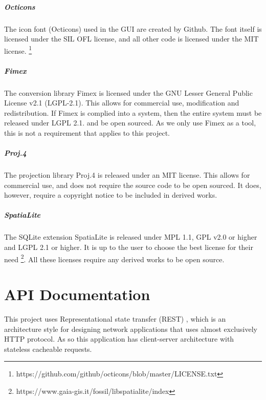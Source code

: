 \documentclass[11pt,a4paper,titlepage,oneside]{report}
\begin{document}
\paragraph{Octicons}
The icon font (Octicons) used in the \gls{GUI} are created by Github. The font itself is licensed under the SIL OFL license, and all other code is licensed under the MIT license. \footnote{https://github.com/github/octicons/blob/master/LICENSE.txt}

\paragraph{Fimex} The conversion library \gls{Fimex} is licensed under the GNU Lesser General Public License v2.1 (LGPL-2.1). This allows for commercial use, modification and redistribution. If \gls{Fimex} is complied into a system, then the entire system must be released under LGPL 2.1. and be open sourced. As we only use \gls{Fimex} as a tool, this is not a requirement that applies to this project.

\paragraph{Proj.4} The projection library Proj.4 is released under an MIT license. This allows for commercial use, and does not require the source code to be open sourced. It does, however, require a copyright notice to be included in derived works.

\paragraph{SpatiaLite} The SQLite extension SpatiaLite is released under MPL 1.1, GPL v2.0 or higher and LGPL 2.1 or higher. It is up to the user to choose the best license for their need \footnote{https://www.gaia-gis.it/fossil/libspatialite/index}. All these licenses require any derived works to be open source.  


\begin{flushleft}
	
\end{flushleft}



\appendix
\printglossary[type=\acronymtype]
\printglossary
\chapter{API Documentation}
This project uses Representational state transfer (REST) \cite{REST:elkstein}, which is an architecture style for designing network applications that uses almost exclusively \gls{HTTP} \gls{protocol}. As so this application has client-server architecture with stateless cacheable requests.
\end{document}
